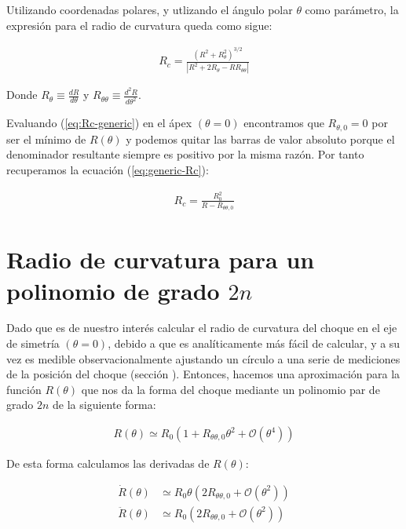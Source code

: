 Utilizando coordenadas polares, y utlizando el ángulo polar $\theta$ como parámetro, la expresión para el radio de curvatura queda como sigue:

\begin{align}
R_c = \frac{\left(R^2 + R^2_\theta\right)^{3/2}}{\left|R^2 + 2R_\theta -RR_{\theta\theta}\right|}\label{eq:Rc-generic}
\end{align}

Donde $R_\theta \equiv \frac{dR}{d\theta}$ y $R_{\theta\theta} \equiv \frac{d^2R}{d\theta^2}$.

Evaluando (\ref{eq:Rc-generic}) en el ápex $(\theta = 0)$ encontramos que $R_{\theta, 0} = 0$ por ser el mínimo de $R(\theta)$ y podemos quitar las barras de valor absoluto porque el denominador resultante siempre es positivo por la misma razón. Por tanto recuperamos la ecuación (\ref{eq:generic-Rc}):

\begin{align}
R_c = \frac{R_0^2}{R- R_{\theta\theta, 0}}\label{eq:Rc-apex}
\end{align}

\section{Radio de curvatura para un polinomio de grado $2n$}
\label{app:curvature-radius-poly}

Dado que es de nuestro interés calcular el radio de curvatura del choque en el eje de simetría
$(\theta=0)$, debido a que es analíticamente más fácil de calcular, y a su vez es medible
observacionalmente ajustando un círculo a una serie de mediciones de la posición del choque (sección ).
Entonces, hacemos una aproximación para la función $R(\theta)$ que nos da la forma del choque
mediante un polinomio par de grado $2n$ de la siguiente forma:

\begin{align}
R(\theta) \simeq R_0\left(1 + R_{\theta \theta, 0}\theta^2 + \mathcal{O}(\theta^4)\right)
\end{align}

De esta forma calculamos las derivadas de $R(\theta)$:

\begin{align}
  \dot{R}(\theta) &\simeq R_0\theta\left(2R_{\theta \theta, 0} + \mathcal{O}(\theta^2)\right) \\
  \ddot{R}(\theta) &\simeq R_0\left(2R_{\theta \theta, 0} + \mathcal{O}(\theta^2)\right)
\end{align}


